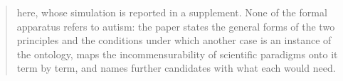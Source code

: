\begin{abstract}
here, whose simulation is reported in a supplement. None of the formal apparatus refers to autism: the paper states the general forms of the two principles and the conditions under which another case is an instance of the ontology, maps the incommensurability of scientific paradigms onto it term by term, and names further candidates with what each would need.

\end{abstract}
